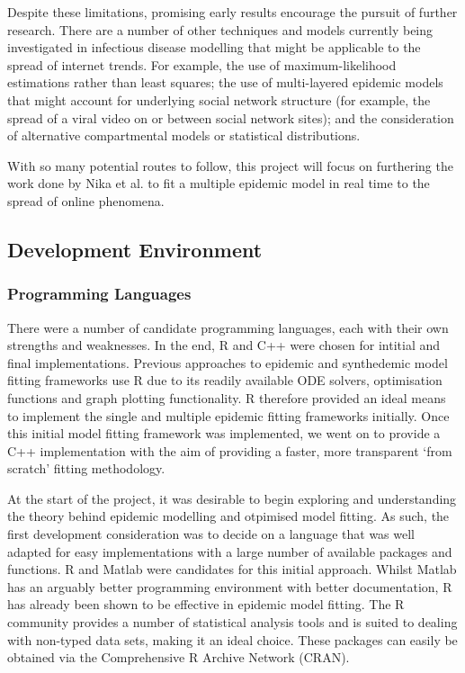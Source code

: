 \documentclass[11pt, a4paper, oneside,titlepage]{article}
\begin{document}
Despite these limitations, promising early results encourage the
pursuit of further research. There are a number of other techniques
and models currently being investigated in infectious disease
modelling that might be applicable to the spread of internet
trends. For example, the use of maximum-likelihood estimations rather
than least squares;\cite{tizzoni} the use of multi-layered epidemic
models that might account for underlying social network structure (for
example, the spread of a viral video on or between social network
sites);\cite{altshuler, tizzoni} and the consideration of alternative
compartmental models or statistical distributions.\cite{meme}

With so many potential routes to follow, this project will focus on furthering the work done by Nika et al. to fit a multiple epidemic model in real time to the spread of online phenomena.

\subsection{Development Environment}
\subsubsection{Programming Languages}
There were a number of candidate programming languages, each with
their own strengths and weaknesses. In the end, R and C++ were chosen
for intitial and final implementations. Previous
approaches to epidemic and synthedemic model fitting frameworks use R
due to its readily available ODE solvers, optimisation functions and
graph plotting functionality.\cite{marily2013,marily2014} R therefore
provided an ideal means to implement the single and multiple epidemic
fitting frameworks initially. Once this initial model fitting
framework was implemented, we went on to provide a C++ implementation
with the aim of providing a faster, more transparent `from scratch'
fitting methodology.

At the start of the project, it was desirable to begin exploring and
understanding the theory behind epidemic modelling and otpimised model
fitting. As such, the first development consideration was to decide on
a language that was well adapted for easy implementations with a large
number of available packages and functions. R and Matlab were
candidates for this initial approach. Whilst Matlab has an arguably
better programming environment with better documentation, R has
already been shown to be effective in epidemic model fitting. The R
community provides a number of statistical analysis tools and is suited to dealing with non-typed data
sets, making it an ideal choice. These packages can easily be obtained
via the Comprehensive R Archive Network (CRAN).
\end{document}
